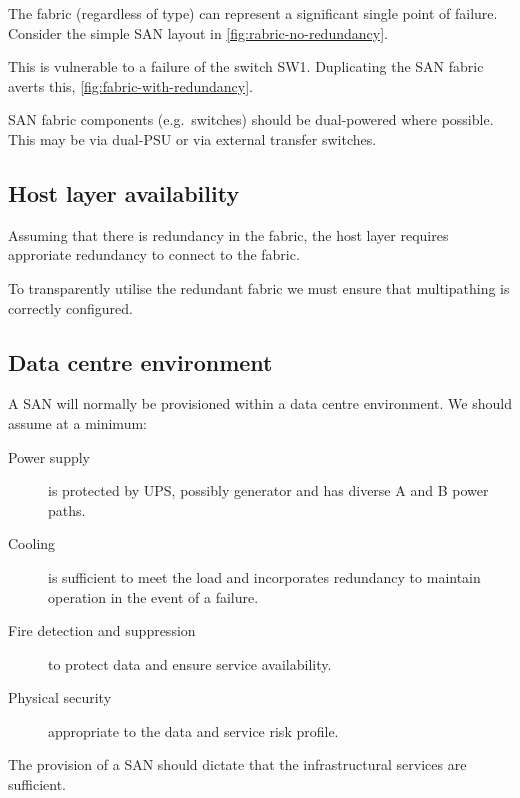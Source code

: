 \documentclass[slides]{pgnotes}
\begin{document}
The fabric (regardless of type) can represent a significant single point
of failure. Consider the simple SAN layout in \autoref{fig:rabric-no-redundancy}.



This is vulnerable to a failure of the switch SW1. Duplicating the SAN
fabric averts this, \autoref{fig:fabric-with-redundancy}.



SAN fabric components (e.g.~switches) should be dual-powered where
possible. This may be via dual-PSU or via external transfer switches.

\subsection{Host layer availability}
\label{sec:host-layer-availability}

Assuming that there is redundancy in the fabric, the host layer requires
approriate redundancy to connect to the fabric.

To transparently utilise the redundant fabric we must ensure that
multipathing is correctly configured.

\subsection{Data centre environment}
\label{sec:data-centre-environment}

A SAN will normally be provisioned within a data centre environment. We
should assume at a minimum:

\begin{description}
\item[Power supply]
is protected by UPS, possibly generator and has diverse A and B power
paths.
\item[Cooling]
is sufficient to meet the load and incorporates redundancy to maintain
operation in the event of a failure.
\item[Fire detection and suppression]
to protect data and ensure service availability.
\item[Physical security]
appropriate to the data and service risk profile.
\end{description}

The provision of a SAN should dictate that the infrastructural services
are sufficient.
\end{document}
